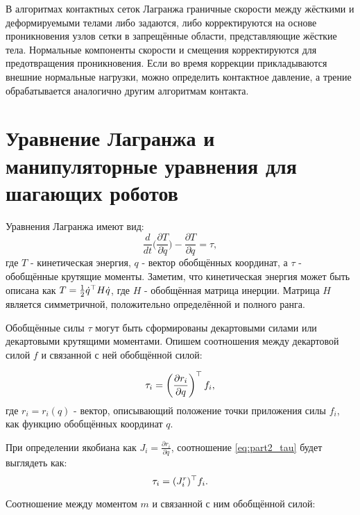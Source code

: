 В алгоритмах контактных сеток Лагранжа граничные скорости между жёсткими и деформируемыми телами либо задаются, либо корректируются на основе проникновения узлов сетки в запрещённые области, представляющие жёсткие тела. Нормальные компоненты скорости и смещения корректируются для предотвращения проникновения. Если во время коррекции прикладываются внешние нормальные нагрузки, можно определить контактное давление, а трение обрабатывается аналогично другим алгоритмам контакта.

\section{Уравнение Лагранжа и манипуляторные уравнения для шагающих роботов}\label{sec:ch2/sect3}

Уравнения Лагранжа имеют вид:
%
\begin{equation}
	\frac{d}{dt} \bigg( 
	\frac{\partial T }{\partial \dot{{q}}}
	\bigg) - 
	\frac{\partial T }{\partial {q}} = \tau,
\end{equation}
%
где $T$ - кинетическая энергия, ${q}$ - вектор обобщённых координат, а $\tau$ - обобщённые крутящие моменты. Заметим, что кинетическая энергия может быть описана как $T = \frac{1}{2} \dot{{q}}^\top {H} \dot{{q}}$, где ${H}$ - обобщённая матрица инерции. Матрица ${H}$ является симметричной, положительно определённой и полного ранга.

Обобщённые силы $\tau$ могут быть сформированы декартовыми силами или декартовыми крутящими моментами. Опишем соотношения между декартовой силой ${f}$ и связанной с ней обобщённой силой:

\begin{equation}
	\label{eq:part2_tau}
	\tau_i = \left( \frac{\partial {r}_i}{\partial {q}} \right)^\top {f}_i,
\end{equation}
%
где ${r}_i = {r}_i({q})$ - вектор, описывающий положение точки приложения силы ${f}_i$, как функцию обобщённых координат ${q}$.

При определении якобиана как ${J}_i = \frac{\partial {r}_i}{\partial {q}}$, соотношение \eqref{eq:part2_tau} будет выглядеть как:
%
\begin{equation}
	\tau_i = ({J}^r_i)^\top {f}_i.
\end{equation}

Соотношение между моментом ${m}$ и связанной с ним обобщённой силой:

